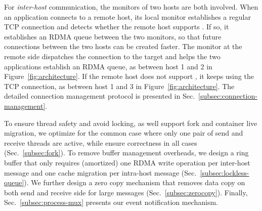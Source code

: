 
For \emph{inter-host} communication, the monitors of two hosts are both involved. When an application connects to a remote host, its local monitor establishes a regular TCP connection and detects whether the remote host supports \sys{}.
If so, it establishes an RDMA queue between the two monitors, so that future connections between the two hosts can be created faster. The monitor at the remote side dispatches the connection to the target and helps the two applications establish an RDMA queue, as between host 1 and 2 in Figure~\ref{fig:architecture}. If the remote host does not support \sys{}, it keeps using the TCP connection, as between host 1 and 3 in Figure~\ref{fig:architecture}. The detailed connection management protocol is presented in Sec.~\ref{subsec:connection-management}.

To ensure thread safety and avoid locking, as well support fork and container live migration, we optimize for the common case where only one pair of send and receive threads are active, while ensure correctness in all cases (Sec.~\ref{subsec:fork}).
To remove buffer management overheads, we design a ring buffer that only requires (amortized) one RDMA write operation per inter-host message and one cache migration per intra-host message (Sec.~\ref{subsec:lockless-queue}).
We further design a zero copy mechanism that removes data copy on both send and receive side for large messages (Sec.~\ref{subsec:zerocopy}).
Finally, Sec.~\ref{subsec:process-mux} presents our event notification mechanism.


